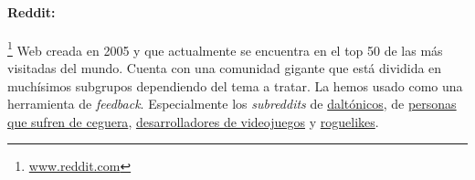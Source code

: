  \paragraph{Reddit:}\footnote{\url{www.reddit.com}} Web creada en 2005 y que actualmente se encuentra en el top 50 de las más visitadas del mundo. Cuenta con una comunidad gigante que está dividida en muchísimos subgrupos dependiendo del tema a tratar. La hemos usado como una herramienta de \textit{feedback}. Especialmente los \textit{subreddits} de \href{https://www.reddit.com/r/ColorBlind/}{daltónicos}, de \href{https://www.reddit.com/r/blind/}{personas que sufren de ceguera}, \href{https://www.reddit.com/r/gamedev/}{desarrolladores de videojuegos} y \href{https://www.reddit.com/r/roguelikes/}{roguelikes}.
